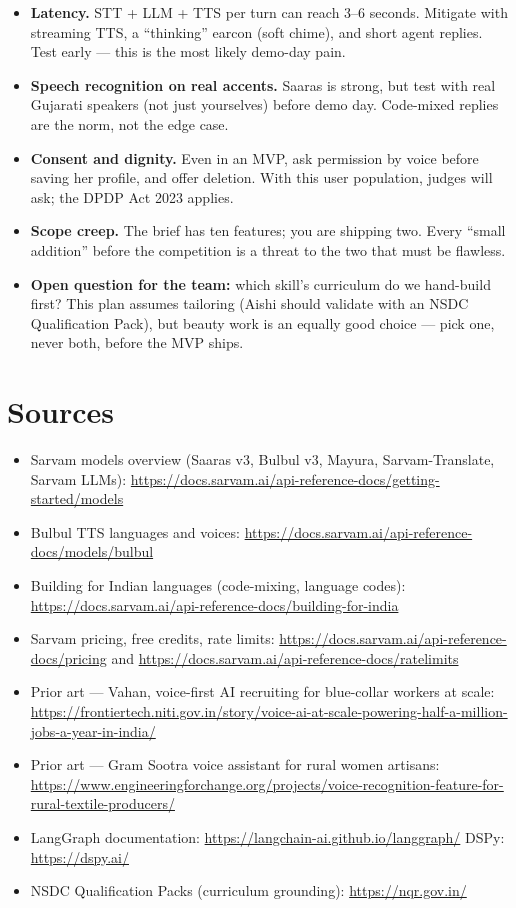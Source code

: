 \documentclass[11pt]{article}
\begin{document}
\begin{itemize}
  \item \textbf{Latency.} STT + LLM + TTS per turn can reach 3--6 seconds. Mitigate with streaming TTS, a ``thinking'' earcon (soft chime), and short agent replies. Test early --- this is the most likely demo-day pain.
  \item \textbf{Speech recognition on real accents.} Saaras is strong, but test with real Gujarati speakers (not just yourselves) before demo day. Code-mixed replies are the norm, not the edge case.
  \item \textbf{Consent and dignity.} Even in an MVP, ask permission by voice before saving her profile, and offer deletion. With this user population, judges will ask; the DPDP Act 2023 applies.
  \item \textbf{Scope creep.} The brief has ten features; you are shipping two. Every ``small addition'' before the competition is a threat to the two that must be flawless.
  \item \textbf{Open question for the team:} which skill's curriculum do we hand-build first? This plan assumes tailoring (Aishi should validate with an NSDC Qualification Pack), but beauty work is an equally good choice --- pick one, never both, before the MVP ships.
\end{itemize}

\section{Sources}

\begin{itemize}
  \item Sarvam models overview (Saaras v3, Bulbul v3, Mayura, Sarvam-Translate, Sarvam LLMs): \url{https://docs.sarvam.ai/api-reference-docs/getting-started/models}
  \item Bulbul TTS languages and voices: \url{https://docs.sarvam.ai/api-reference-docs/models/bulbul}
  \item Building for Indian languages (code-mixing, language codes): \url{https://docs.sarvam.ai/api-reference-docs/building-for-india}
  \item Sarvam pricing, free credits, rate limits: \url{https://docs.sarvam.ai/api-reference-docs/pricing} and \url{https://docs.sarvam.ai/api-reference-docs/ratelimits}
  \item Prior art --- Vahan, voice-first AI recruiting for blue-collar workers at scale: \url{https://frontiertech.niti.gov.in/story/voice-ai-at-scale-powering-half-a-million-jobs-a-year-in-india/}
  \item Prior art --- Gram Sootra voice assistant for rural women artisans: \url{https://www.engineeringforchange.org/projects/voice-recognition-feature-for-rural-textile-producers/}
  \item LangGraph documentation: \url{https://langchain-ai.github.io/langgraph/} \quad DSPy: \url{https://dspy.ai/}
  \item NSDC Qualification Packs (curriculum grounding): \url{https://nqr.gov.in/}
\end{itemize}
\end{document}
